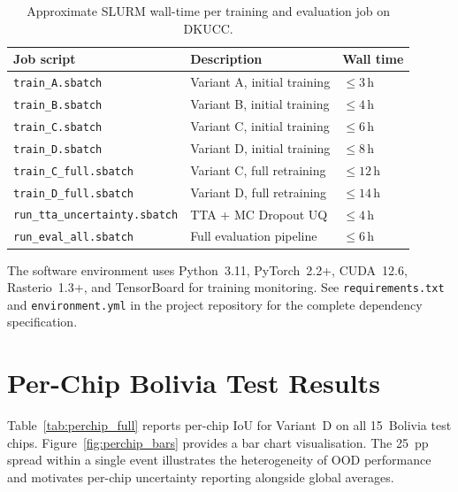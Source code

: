 \documentclass[12pt,oneside]{report}
\begin{document}
\begin{table}[htbp]
\centering
\caption{Approximate SLURM wall-time per training and evaluation job on DKUCC.}
\label{tab:slurm_jobs}
\begin{tabular}{lll}
\toprule
\textbf{Job script} & \textbf{Description} & \textbf{Wall time} \\
\midrule
\texttt{train\_A.sbatch}          & Variant A, initial training   & $\leq 3$\,h \\
\texttt{train\_B.sbatch}          & Variant B, initial training   & $\leq 4$\,h \\
\texttt{train\_C.sbatch}          & Variant C, initial training   & $\leq 6$\,h \\
\texttt{train\_D.sbatch}          & Variant D, initial training   & $\leq 8$\,h \\
\texttt{train\_C\_full.sbatch}    & Variant C, full retraining    & $\leq 12$\,h \\
\texttt{train\_D\_full.sbatch}    & Variant D, full retraining    & $\leq 14$\,h \\
\texttt{run\_tta\_uncertainty.sbatch} & TTA + MC Dropout UQ       & $\leq 4$\,h \\
\texttt{run\_eval\_all.sbatch}    & Full evaluation pipeline      & $\leq 6$\,h \\
\bottomrule
\end{tabular}
\end{table}

The software environment uses Python~3.11, PyTorch~2.2+, CUDA~12.6,
Rasterio~1.3+, and TensorBoard for training monitoring.
See \texttt{requirements.txt} and \texttt{environment.yml} in the project
repository for the complete dependency specification.

\chapter{Per-Chip Bolivia Test Results}
\label{app:perchip}

Table~\ref{tab:perchip_full} reports per-chip IoU for Variant~D on all
15~Bolivia test chips.
Figure~\ref{fig:perchip_bars} provides a bar chart visualisation.
The 25~pp spread within a single event illustrates the heterogeneity of OOD
performance and motivates per-chip uncertainty reporting alongside global
averages.
\end{document}
